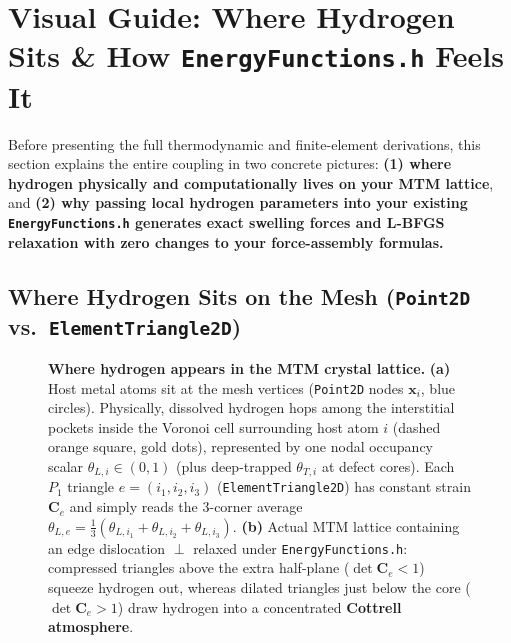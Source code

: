 \documentclass[11pt,a4paper]{article}
\newcommand{\code}[1]{\texttt{#1}}
\begin{document}
\tableofcontents
\newpage

\section{Visual Guide: Where Hydrogen Sits \& How \texorpdfstring{\code{EnergyFunctions.h}}{EnergyFunctions.h} Feels It}
\label{sec:visual_guide}

Before presenting the full thermodynamic and finite-element derivations, this section explains the entire coupling in two concrete pictures: \textbf{(1) where hydrogen physically and computationally lives on your MTM lattice}, and \textbf{(2) why passing local hydrogen parameters into your existing \code{EnergyFunctions.h} generates exact swelling forces and L-BFGS relaxation with zero changes to your force-assembly formulas.}

\subsection{Where Hydrogen Sits on the Mesh (\code{Point2D} vs.\ \code{ElementTriangle2D})}

\begin{figure}[ht!]
\centering
\resizebox{\textwidth}{!}{}
\caption{\textbf{Where hydrogen appears in the MTM crystal lattice.} \textbf{(a)} Host metal atoms sit at the mesh vertices (\code{Point2D} nodes $\mathbf{x}_i$, blue circles). Physically, dissolved hydrogen hops among the interstitial pockets inside the Voronoi cell surrounding host atom $i$ (dashed orange square, gold dots), represented by one nodal occupancy scalar $\theta_{L,i} \in (0,1)$ (plus deep-trapped $\theta_{T,i}$ at defect cores). Each $P_1$ triangle $e=(i_1,i_2,i_3)$ (\code{ElementTriangle2D}) has constant strain $\mathbf{C}_e$ and simply reads the 3-corner average $\theta_{L,e}=\frac{1}{3}(\theta_{L,i_1}+\theta_{L,i_2}+\theta_{L,i_3})$. \textbf{(b)} Actual MTM lattice containing an edge dislocation $\perp$ relaxed under \code{EnergyFunctions.h}: compressed triangles above the extra half-plane ($\det\mathbf{C}_e < 1$) squeeze hydrogen out, whereas dilated triangles just below the core ($\det\mathbf{C}_e > 1$) draw hydrogen into a concentrated \textbf{Cottrell atmosphere}.}
\label{fig:where_h_lives}
\end{figure}
\end{document}
